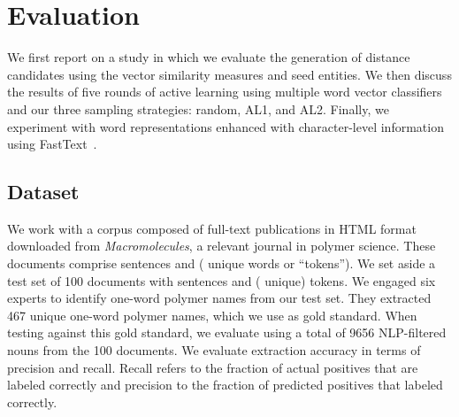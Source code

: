 \section{Evaluation}
\label{sect:apner_results}
We first report on a study in which we evaluate the generation of distance candidates using the vector similarity measures and seed entities. 
We then discuss the results of five rounds of active learning using multiple word vector classifiers and our three sampling strategies: random, AL1, and AL2.
Finally, we experiment with word representations enhanced with character-level information using FastText~\cite{bojanowski2016enriching,joulin2016bag}.

\subsection{Dataset}
We work with a corpus composed of  full-text publications in HTML format downloaded from \textit{Macromolecules}, a relevant journal in polymer science.
These documents comprise  sentences and  ( unique words or ``tokens'').
We set aside a test set of  100 documents with   sentences and  ( unique) tokens. 
We engaged six experts to identify one-word polymer names from our test set.
They extracted 467 unique one-word polymer names, which we use as gold standard.
When testing against this gold standard, we evaluate using a total of 9656 NLP-filtered nouns from the 100 documents.
We evaluate extraction accuracy in terms of precision and recall.
Recall refers to the fraction of actual positives that
are labeled correctly and precision to the fraction of predicted
positives that labeled correctly.

